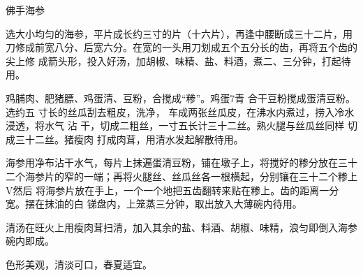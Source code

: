 \begin{recipe}{佛手海参}

\ingredients


\cooking

\step 选大小均匀的海参，平片成长约三寸的片（十六片），再逢中腰断成三十二片，用
刀修成前宽八分、后宽六分。在宽的一头用刀划成五个五分长的齿，再将五个齿的尖上修
成箭头形，投入好汤，加胡椒、味精、盐、料酒，煮二、三分钟，打起待用。

鸡脯肉、肥猪膘、鸡蛋清、豆粉，合搅成“糁”。鸡蛋7青 合干豆粉搅成蛋清豆粉。选约五
寸长的丝瓜刮去粗皮，洗净， 车成两张丝瓜皮，在沸水内煮过，捞入冷水浸透，将水气
沾 干，切成二粗丝，一寸五长计三十二丝。熟火腿与丝瓜丝同样 切成三十二丝。猪瘦肉
打成肉茸，用清水发起解散待用。

\step 海参用净布沾干水气，每片上抹遍蛋清豆粉，铺在墩子上，将搅好的糁分放在三十
二个海参片的窄的一端；再将火腿丝、丝瓜丝各一根横起，分别镶在三十二个糁上V然后
将海参片放在手上，一个一个地把五齿翻转来贴在糁上。齿的距离一分宽。摆在抹油的白
锑盘内，上笼蒸三分钟，取出放入大薄碗内待用。

\step 清汤在旺火上用瘦肉茸扫清，加入其余的盐、料酒、胡椒、味精，浪匀即倒入海参
碗内即成。

\notes

色形美观，清淡可口，春夏适宜。

\end{recipe}

